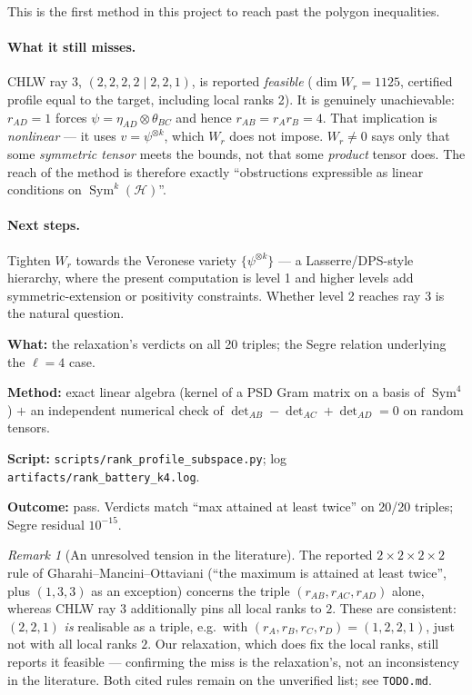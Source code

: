 \documentclass[11pt]{article}
\theoremstyle{definition}
\theoremstyle{remark}
\newtheorem{remark}[theorem]{Remark}
\newcommand{\Sym}{\operatorname{Sym}}
\newcommand{\Hil}{\mathcal{H}}
\begin{document}
This is the first method in this project to reach past the polygon inequalities.

\paragraph{What it still misses.}
CHLW ray 3, $(2,2,2,2 \mid 2,2,1)$, is reported \emph{feasible} ($\dim W_r = 1125$,
certified profile equal to the target, including local ranks 2). It is genuinely
unachievable: $r_{AD} = 1$ forces $\psi = \eta_{AD}\otimes\theta_{BC}$ and hence
$r_{AB} = r_A r_B = 4$. That implication is \emph{nonlinear} --- it uses
$v = \psi^{\otimes k}$, which $W_r$ does not impose. $W_r \ne 0$ says only that some
\emph{symmetric tensor} meets the bounds, not that some \emph{product} tensor does.
The reach of the method is therefore exactly ``obstructions expressible as linear
conditions on $\Sym^k(\Hil)$''.

\paragraph{Next steps.}
Tighten $W_r$ towards the Veronese variety $\{\psi^{\otimes k}\}$ --- a
Lasserre/DPS-style hierarchy, where the present computation is level 1 and higher
levels add symmetric-extension or positivity constraints. Whether level 2 reaches
ray 3 is the natural question.

\begin{verification}
\textbf{What:} the relaxation's verdicts on all 20 triples; the Segre relation
underlying the $\ell=4$ case.

\textbf{Method:} exact linear algebra (kernel of a PSD Gram matrix on a basis of
$\Sym^4$) $+$ an independent numerical check of
$\det_{AB} - \det_{AC} + \det_{AD} = 0$ on random tensors.

\textbf{Script:} \texttt{scripts/rank\_profile\_subspace.py};
log \texttt{artifacts/rank\_battery\_k4.log}.

\textbf{Outcome:} pass. Verdicts match ``max attained at least twice'' on 20/20
triples; Segre residual $10^{-15}$.
\end{verification}

\begin{remark}[An unresolved tension in the literature]
The reported $2\times2\times2\times2$ rule of Gharahi--Mancini--Ottaviani (``the maximum
is attained at least twice'', plus $(1,3,3)$ as an exception) concerns the triple
$(r_{AB},r_{AC},r_{AD})$ alone, whereas CHLW ray 3 additionally pins all local ranks to
$2$. These are consistent: $(2,2,1)$ \emph{is} realisable as a triple, e.g.\ with
$(r_A,r_B,r_C,r_D) = (1,2,2,1)$, just not with all local ranks $2$. Our relaxation,
which does fix the local ranks, still reports it feasible --- confirming the miss is the
relaxation's, not an inconsistency in the literature. Both cited rules remain on the
unverified list; see \texttt{TODO.md}.
\end{remark}
\end{document}
